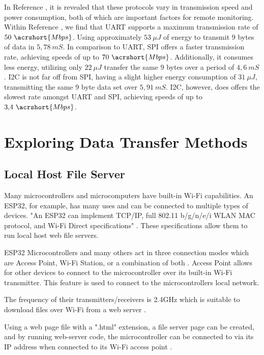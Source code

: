 \documentclass[class=report,11pt,crop=false]{standalone}
\begin{document}
In Reference \cite{SerialEval}, it is revealed that these protocols vary in transmission speed and power consumption, both of which are important factors for remote monitoring. Within Reference \cite{SerialEval}, we find that \acrshort{UART} supports a maximum transmission rate of $50\ \acrshort{Mbps}$. Using approximately $53\ \mu J$ of energy to transmit 9 bytes of data in $5{,}78\ mS$. In comparison to \acrshort{UART}, \acrshort{SPI} offers a faster transmission rate, achieving speeds of up to $70\ \acrshort{Mbps}$. Additionally, it consumes less energy, utilizing only $22\ \mu J$ transfer the same 9 bytes over a period of $4{,}6\ mS$. \acrshort{I2C} is not far off from \acrshort{SPI}, having a slight higher energy consumption of $31\ \mu J$, transmitting the same 9 byte data set over $5{,}91\ mS$. \acrshort{I2C}, however, does offers the slowest rate amongst \acrshort{UART} and \acrshort{SPI}, achieving speeds of up to $3{,}4\ \acrshort{Mbps}$.  

\newpage
\section{Exploring Data Transfer Methods}

\subsection{Local Host File Server}
Many microcontrollers and microcomputers have built-in Wi-Fi capabilities. An ESP32, for example, has many uses and can be connected to multiple types of devices. "An ESP32 can implement TCP/IP, full 802.11 b/g/n/e/i WLAN MAC protocol, and Wi-Fi Direct specifications" \cite[p~3]{WiFiSpecs}.  These specifications allow them to run local host web file servers.

ESP32 Microcontrollers and many others act in three connection modes which are Access Point, Wi-Fi Station, or a combination of both \cite{WiFiConnections}. Access Point allows for other devices to connect to the microcontroller over its built-in Wi-Fi transmitter. This feature is used to connect to the microcontrollers local network.

The frequency of their transmitters/receivers is 2.4GHz which is suitable to download files over Wi-Fi from a web server \cite{WiFiSpecs}.

Using a web page file with a ".html" extension, a file server page can be created, and by running web-server code, the microcontroller can be connected to via its IP address when connected to its Wi-Fi access point \cite{WiFiSpecs}.
\end{document}
